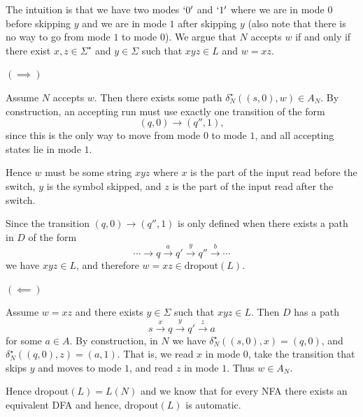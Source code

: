 \documentclass[12pt]{article}
\begin{document}
\begin{solution}
\begin{enumerate}
        The intuition is that we have two modes $`0'$ and $`1'$ where we are in mode $0$ before skipping $y$ and we are in mode $1$ after skipping $y$ (also note that there is no way to go from mode $1$ to mode $0$). We argue that $N$ accepts $w$ if and only if there exist $x,z \in \Sigma^\star$ and $y \in \Sigma$ such that $xyz \in L$ and $w = xz$.

        $(\implies)$

        Assume $N$ accepts $w$. Then there exists some path $\delta^\star_N((s,0), w) \in A_N$. 
        By construction, an accepting run must use exactly one transition of the form
        \[
        (q,0) \to (q'',1),
        \]
        since this is the only way to move from mode $0$ to mode $1$, and all accepting states lie in mode $1$.
        
        
        Hence $w$ must be some string $xyz$ where $x$ is the part of the input read before the switch, $y$ is the symbol skipped, and $z$ is the part of the input read after the switch. 

        Since the transition $(q,0) \to (q'',1)$ is only defined when there exists a path in $D$ of the form
        \[
        \cdots \xrightarrow{} q \xrightarrow{a} q' \xrightarrow{y} q'' \xrightarrow{b} \cdots
        \]
        we have $xyz \in L$, and therefore $w = xz \in \text{dropout}(L)$.

        $(\impliedby)$

        Assume $w = xz$ and there exists $y \in \Sigma$ such that $xyz \in L$. Then $D$ has a path
        \[
        s \xrightarrow{x} q \xrightarrow{y} q' \xrightarrow{z} a
        \]
        for some $a \in A$.
        By construction, in $N$ we have $\delta^\star_N((s, 0), x) = (q,0)$, and  $\delta_N^\star((q,0), z) = (a, 1)$. That is, we read $x$ in mode $0$, take the transition that skips $y$ and moves to mode $1$, and read $z$ in mode $1$. Thus $w \in A_N$.
        
        Hence dropout$(L) =L(N)$ and we know that for every NFA there exists an equivalent DFA and hence, dropout$(L)$ is automatic.
    \end{enumerate}
\end{solution}
\end{document}
